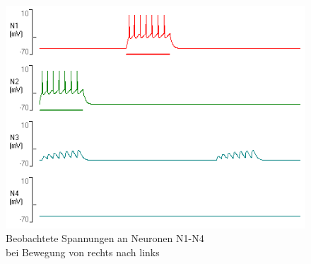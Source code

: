 \documentclass[a4paper]{article}
\begin{document}
\begin{figure}[H]
    \centering
    \includegraphics[scale=0.7]{images/Aufgabe4_1_rechtsLinks.png}
    \caption{Beobachtete Spannungen an Neuronen N1-N4 \\ bei Bewegung von rechts nach links}
    \label{fig:A4_1b}
\end{figure}

\newpage
\end{document}
